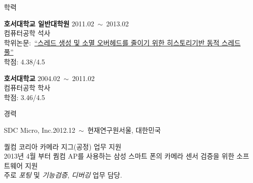 \documentclass{resume} %
\begin{document}


\begin{rSection}{학력}

{\bf 호서대학교 일반대학원} \hfill 2011.02~$\sim$~2013.02 \\
컴퓨터공학 석사 \\
학위논문:~\href{http://dlibrary.hoseo.ac.kr/search/searchDetail.do?rec_key=SH1_000000950591}
{\small ``스레드 생성 및 소멸 오버헤드를 줄이기 위한 히스토리기반 동적 스레드 풀''} \\
학점: 4.38/4.5

{\bf 호서대학교} \hfill 2004.02~$\sim$~2011.02 \\
컴퓨터공학 학사 \\
학점: 3.46/4.5

\end{rSection}



\begin{rSection}{경력}



  \begin{rSubsection}{SDC Micro, Inc.}{2012.12~$\sim$~현재}{연구원}{서울, 대한민국}
  \item 퀄컴 코리아 카메라 지그(공정) 업무 지원
    \vspace{1mm} \\
    \small{
      2013년 4월 부터 퀌컴 AP를 사용하는 삼성 스마트 폰의 카메라 센서 검증을 위한 소프트웨어 지원 \\
      주로 \textit{포팅} 및 \textit{기능검증}, \textit{디버깅} 업무 담당.}
  \end{rSubsection}

\end{rSection}
\vspace{-2mm}


\end{document}
